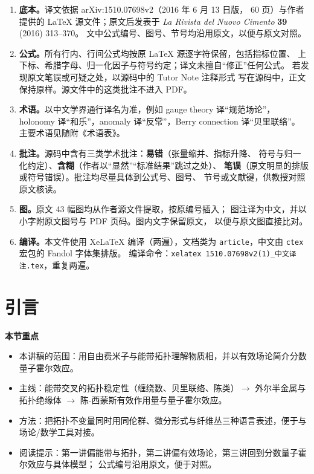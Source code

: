 \documentclass[11pt,a4paper]{article}
\numberwithin{equation}{section}
\newenvironment{keytakeaways}
  {\par\medskip\noindent\textbf{本节重点}\begin{itemize}\small}
  {\end{itemize}\par\medskip}
\begin{document}
\begin{enumerate}
  \item \textbf{底本。}译文依据 arXiv:1510.07698v2（2016 年 6 月 13 日版，
        60 页）与作者提供的 LaTeX 源文件；原文后发表于
        \textit{La Rivista del Nuovo Cimento} \textbf{39} (2016) 313--370。
        文中公式编号、图号、节号均沿用原文，以便与原文对照。

  \item \textbf{公式。}所有行内、行间公式均按原 LaTeX 源逐字符保留，包括指标位置、
        上下标、希腊字母、归一化因子与符号约定；译文未擅自“修正”任何公式。
        若发现原文笔误或可疑之处，以源码中的 Tutor Note 注释形式
        写在源码中，正文保持原样。源文件中的这类批注不进入 PDF。

  \item \textbf{术语。}以中文学界通行译名为准，例如 gauge theory 译“规范场论”，
        holonomy 译“和乐”，anomaly 译“反常”，Berry connection 译“贝里联络”。
        主要术语见随附《术语表》。

  \item \textbf{批注。}源码中含有三类学术批注：\textbf{易错}（张量缩并、指标升降、
        符号与归一化约定）、\textbf{含糊}（作者以“显然”“标准结果”跳过之处）、
        \textbf{笔误}（原文明显的排版或符号错误）。批注均尽量具体到公式号、图号、
        节号或文献键，供教授对照原文核读。

  \item \textbf{图。}原文 43 幅图均从作者源文件提取，按原编号插入；
        图注译为中文，并以小字附原文图号与 PDF 页码。图内文字保留原文，
        以便与原文图直接比对。

  \item \textbf{编译。}本文件使用 XeLaTeX{} 编译（两遍），文档类为
        \texttt{article}，中文由 \texttt{ctex} 宏包的 Fandol 字体集排版。
        编译命令：\texttt{xelatex 1510.07698v2(1)\_中文译注.tex}，重复两遍。
\end{enumerate}

\clearpage

\section{引言}

\begin{keytakeaways}
  \item 本讲稿的范围：用自由费米子与能带拓扑理解物质相，并以有效场论简介分数量子霍尔效应。
  \item 主线：能带交叉的拓扑稳定性（缠绕数、贝里联络、陈类）$\rightarrow$ 外尔半金属与拓扑绝缘体
        $\rightarrow$ 陈-西蒙斯有效作用量与量子霍尔效应。
  \item 方法：把拓扑不变量同时用同伦群、微分形式与纤维丛三种语言表述，便于与场论/数学工具对接。
  \item 阅读提示：第一讲偏能带与拓扑，第二讲偏有效场论，第三讲回到分数量子霍尔效应与具体模型；
        公式编号沿用原文，便于对照。
\end{keytakeaways}
\end{document}
